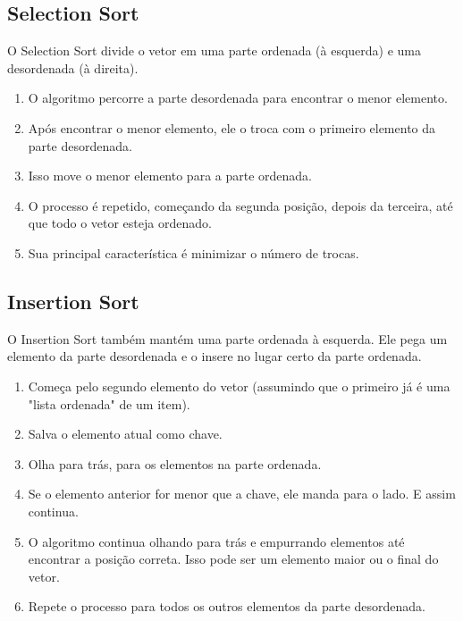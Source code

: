 \documentclass[a4paper]{article}
\begin{document}
    \subsection{Selection Sort}\label{subsec:selection-sort}
    O Selection Sort divide o vetor em uma parte ordenada (à esquerda) e uma desordenada (à direita).
    \begin{enumerate}
        \item O algoritmo percorre a parte desordenada para encontrar o menor elemento.
        \item Após encontrar o menor elemento, ele o troca com o primeiro elemento da parte desordenada.
        \item Isso move o menor elemento para a parte ordenada.
        \item O processo é repetido, começando da segunda posição, depois da terceira, até que todo o vetor esteja ordenado.
        \item Sua principal característica é minimizar o número de trocas.
    \end{enumerate}

    \subsection{Insertion Sort}\label{subsec:insertion-sort}
    O Insertion Sort também mantém uma parte ordenada à esquerda.
    Ele pega um elemento da parte desordenada e o insere no lugar certo da parte ordenada.
    \begin{enumerate}
        \item Começa pelo segundo elemento do vetor (assumindo que o primeiro já é uma "lista ordenada" de um item).
        \item Salva o elemento atual como chave.
        \item Olha para trás, para os elementos na parte ordenada.
        \item Se o elemento anterior for menor que a chave, ele manda para o lado. E assim continua.
        \item O algoritmo continua olhando para trás e empurrando elementos até encontrar a posição correta.
        Isso pode ser um elemento maior ou o final do vetor.
        \item Repete o processo para todos os outros elementos da parte desordenada.
    \end{enumerate}
\end{document}
